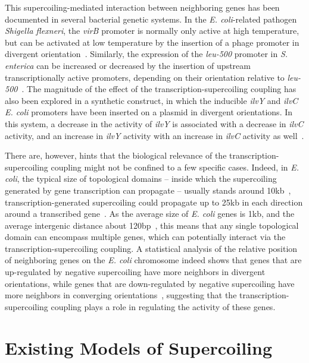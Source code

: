 This supercoiling-mediated interaction between neighboring genes has been documented in several bacterial genetic systems.
In the \emph{E. coli}-related pathogen \emph{Shigella flexneri}, the \emph{virB} promoter is normally only active at high temperature, but can be activated at low temperature by the insertion of a phage promoter in divergent orientation~\citep{tobe1995}.
Similarly, the expression of the \emph{leu-500} promoter in \emph{S. enterica} can be increased or decreased by the insertion of upstream transcriptionally active promoters, depending on their orientation relative to \emph{leu-500}~\citep{elhanafi2000}.
The magnitude of the effect of the transcription-supercoiling coupling has also been explored in a synthetic construct, in which the inducible \emph{ilvY} and \emph{ilvC} \emph{E. coli} promoters have been inserted on a plasmid in divergent orientations.
In this system, a decrease in the activity of \emph{ilvY} is associated with a decrease in \emph{ilvC} activity, and an increase in \emph{ilvY} activity with an increase in \emph{ilvC} activity as well~\citep{rhee1999}.

There are, however, hints that the biological relevance of the transcription-supercoiling coupling might not be confined to a few specific cases.
Indeed, in \emph{E. coli}, the typical size of topological domains --  inside which the supercoiling generated by gene transcription can propagate -- usually stands around 10kb~\citep{postow2004}, transcription-generated supercoiling could propagate up to 25kb in each direction around a transcribed gene~\citep{visser2022}.
As the average size of \emph{E. coli} genes is 1kb, and the average intergenic distance about 120bp~\citep{blattner1997}, this means that any single topological domain can encompass multiple genes, which can potentially interact via the transcription-supercoiling coupling.
A statistical analysis of the relative position of neighboring genes on the \emph{E. coli} chromosome indeed shows that genes that are up-regulated by negative supercoiling have more neighbors in divergent orientations, while genes that are down-regulated by negative supercoiling have more neighbors in converging orientations~\citep{sobetzko2016}, suggesting that the transcription-supercoiling coupling plays a role in regulating the activity of these genes.


\section{Existing Models of Supercoiling}

